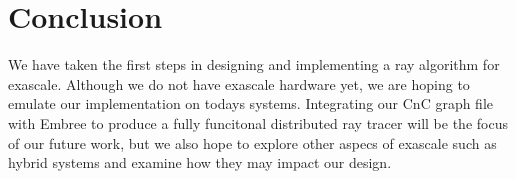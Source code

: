 \section{Conclusion}
We have taken the first steps in designing and implementing a ray algorithm for exascale.  Although we do not have exascale hardware yet, we are hoping to emulate our implementation on todays systems.  Integrating our CnC graph file with Embree to produce a fully funcitonal distributed ray tracer will be the focus of our future work, but we also hope to explore other aspecs of exascale such as hybrid systems and examine how they may impact our design.  


